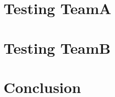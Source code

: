 \documentclass[12pt]{article}
\begin{document}


\newpage
\tableofcontents

\pagebreak

\section{Testing TeamA}



\section{Testing TeamB}



\newpage
\section{Conclusion}

\end{document}
